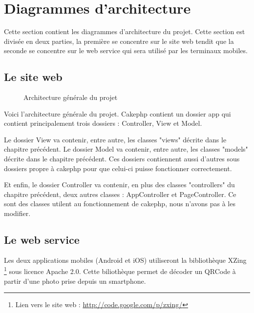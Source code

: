 \chapter{Diagrammes d'architecture}

Cette section contient les diagrammes d'architecture du projet. Cette section est divisée en deux parties, la première se concentre sur le site web tendit que la seconde se concentre sur le web service qui sera utilisé par les terminaux mobiles.

\newpage
\section{Le site web}

\begin{figure}[H]
	\begin{center}\end{center}
	\caption{Architecture générale du projet}
\end{figure}

Voici l'architecture générale du projet. Cakephp contient un dossier app qui contient principalement trois dossiers : Controller, View et Model. 

Le dossier View va contenir, entre autre, les classes "views" décrite dans le chapitre précédent. Le dossier Model va contenir, entre autre, les classes "models" décrite dans le chapitre précédent. Ces dossiers contiennent aussi d'autres sous dossiers propre à cakephp pour que celui-ci puisse fonctionner correctement.


Et enfin, le dossier Controller va contenir, en plus des classes "controllers" du chapitre précédent, deux autres classes : AppController et PageController. Ce sont des classes utilent au fonctionnement de cakephp, nous n'avons pas à les modifier.

\section{Le web service}
Les deux applications mobiles (Android et iOS) utiliseront la bibliothèque XZing \footnote{Lien vers le site web : \href{http://code.google.com/p/zxing/}{http://code.google.com/p/zxing/}} sous licence Apache 2.0.
Cette biliothèque permet de décoder un QRCode à partir d'une photo prise depuis un smartphone.

